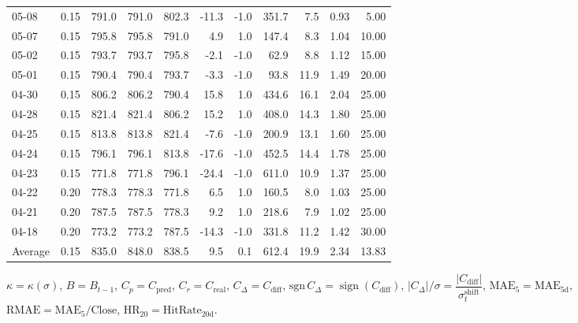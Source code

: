 \begin{threeparttable}
{\begin{tabular}{lrrrrrrrrrr}
05-08 & 0.15 & 791.0 & 791.0 & 802.3 & -11.3 & -1.0 & 351.7 & 7.5 & 0.93 & 5.00 \\
05-07 & 0.15 & 795.8 & 795.8 & 791.0 & 4.9 & 1.0 & 147.4 & 8.3 & 1.04 & 10.00 \\
05-02 & 0.15 & 793.7 & 793.7 & 795.8 & -2.1 & -1.0 & 62.9 & 8.8 & 1.12 & 15.00 \\
05-01 & 0.15 & 790.4 & 790.4 & 793.7 & -3.3 & -1.0 & 93.8 & 11.9 & 1.49 & 20.00 \\
04-30 & 0.15 & 806.2 & 806.2 & 790.4 & 15.8 & 1.0 & 434.6 & 16.1 & 2.04 & 25.00 \\
04-28 & 0.15 & 821.4 & 821.4 & 806.2 & 15.2 & 1.0 & 408.0 & 14.3 & 1.80 & 25.00 \\
04-25 & 0.15 & 813.8 & 813.8 & 821.4 & -7.6 & -1.0 & 200.9 & 13.1 & 1.60 & 25.00 \\
04-24 & 0.15 & 796.1 & 796.1 & 813.8 & -17.6 & -1.0 & 452.5 & 14.4 & 1.78 & 25.00 \\
04-23 & 0.15 & 771.8 & 771.8 & 796.1 & -24.4 & -1.0 & 611.0 & 10.9 & 1.37 & 25.00 \\
04-22 & 0.20 & 778.3 & 778.3 & 771.8 & 6.5 & 1.0 & 160.5 & 8.0 & 1.03 & 25.00 \\
04-21 & 0.20 & 787.5 & 787.5 & 778.3 & 9.2 & 1.0 & 218.6 & 7.9 & 1.02 & 25.00 \\
04-18 & 0.20 & 773.2 & 773.2 & 787.5 & -14.3 & -1.0 & 331.8 & 11.2 & 1.42 & 30.00 \\
Average & 0.15 & 835.0 & 848.0 & 838.5 & 9.5 & 0.1 & 612.4 & 19.9 & 2.34 & 13.83 \\
\bottomrule
\end{tabular}
}%
\begin{tablenotes}\footnotesize
\item $\kappa=\kappa(\sigma)$, $B=B_{t-1}$, $C_p=C_{\text{pred}}$, $C_r=C_{\text{real}}$, $C_\Delta=C_{\text{diff}}$, $\mathrm{sgn}\,C_\Delta=\operatorname{sign}(C_{\text{diff}})$, $|C_\Delta|/\sigma=\dfrac{|C_{\text{diff}}|}{\sigma_t^{\text{shift}}}$, $\mathrm{MAE}_5=\mathrm{MAE}_{5\text{d}}$, $\mathrm{RMAE}= \mathrm{MAE}_5 / \text{Close}$, $\mathrm{HR}_{20}=\mathrm{HitRate}_{20\text{d}}$.
\end{tablenotes}
\end{threeparttable}
\endgroup